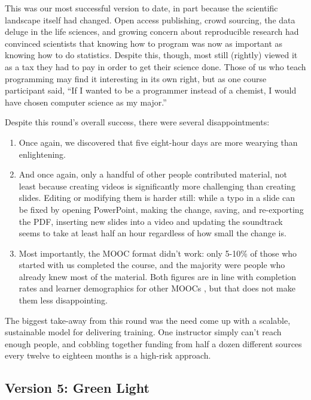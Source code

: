\documentclass[10pt,a4paper,twocolumn]{article}
\begin{document}
This was our most successful version to date, in part because the
scientific landscape itself had changed. Open access publishing, crowd
sourcing, the data deluge in the life sciences, and growing concern
about reproducible research had convinced scientists that knowing how
to program was now as important as knowing how to do statistics.
Despite this, though, most still (rightly) viewed it as a tax they had
to pay in order to get their science done. Those of us who teach
programming may find it interesting in its own right, but as one
course participant said, ``If I wanted to be a programmer instead of a
chemist, I would have chosen computer science as my major.''

Despite this round's overall success, there were several
disappointments:

\begin{enumerate}

\item
  Once again, we discovered that five eight-hour days are more wearying
  than enlightening.

\item
  And once again, only a handful of other people contributed material,
  not least because creating videos is significantly more challenging
  than creating slides. Editing or modifying them is harder still:
  while a typo in a slide can be fixed by opening PowerPoint, making
  the change, saving, and re-exporting the PDF, inserting new slides
  into a video and updating the soundtrack seems to take at least half
  an hour regardless of how small the change is.

\item
  Most importantly, the MOOC format didn't work: only 5-10\% of those
  who started with us completed the course, and the majority were
  people who already knew most of the material. Both figures are in
  line with completion rates and learner demographics for other MOOCs
  \cite{jordan2013}, but that does not make them less disappointing.

\end{enumerate}

The biggest take-away from this round was the need come up with a
scalable, sustainable model for delivering training. One instructor
simply can't reach enough people, and cobbling together funding from
half a dozen different sources every twelve to eighteen months is a
high-risk approach.

\subsection*{Version 5: Green Light}
\end{document}
